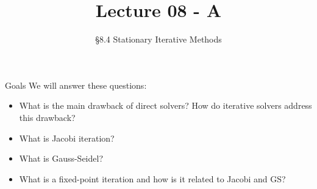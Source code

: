 \documentclass[10pt]{beamer}
\title[Math/CS 375]{Lecture 08 - A}
\subtitle{\S 8.4 Stationary Iterative Methods}
\begin{document}
\begin{frame}
  \titlepage
\end{frame}
\begin{frame}{Goals}
We will answer these questions:\\[3mm]
\begin{itemize}
    \item What is the main drawback of direct solvers? How do iterative solvers address this drawback? 
    \item What is Jacobi iteration?
    \item What is Gauss-Seidel?
    \item What is a fixed-point iteration and how is it related to Jacobi and GS?
\end{itemize}
\end{frame}


\end{document}
